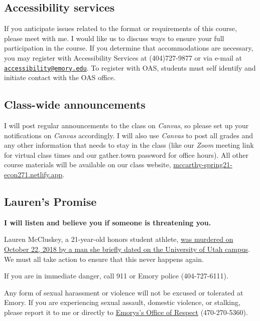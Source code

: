 \documentclass[11pt,]{article}
\begin{document}
\hypertarget{accessibility-services}{%
\subsection{Accessibility services}\label{accessibility-services}}

If you anticipate issues related to the format or requirements of this
course, please meet with me. I would like us to discuss ways to ensure
your full participation in the course. If you determine that
accommodations are necessary, you may register with Accessibility
Services at (404)727-9877 or via e-mail at
\href{mailto:accessibility@emory.edu}{\nolinkurl{accessibility@emory.edu}}.
To register with OAS, students must self identify and initiate contact
with the OAS office.

\hypertarget{class-wide-announcements}{%
\subsection{Class-wide announcements}\label{class-wide-announcements}}

I will post regular announcements to the class on \emph{Canvas}, so
please set up your notifications on \emph{Canvas} accordingly. I will
also use \emph{Canvas} to post all grades and any other information that
needs to stay in the class (like our \emph{Zoom} meeting link for
virtual class times and our gather.town password for office hours). All
other course materials will be available on our class website,
\href{https://mccarthy-spring21-econ372.netlify.app/}{mccarthy-spring21-econ271.netlify.app}.

\hypertarget{laurens-promise}{%
\subsection{Lauren's Promise}\label{laurens-promise}}

\textbf{I will listen and believe you if someone is threatening you.}

Lauren McCluskey, a 21-year-old honors student athlete,
\href{https://www.sltrib.com/opinion/commentary/2019/02/10/commentary-failing-lauren/}{was
murdered on October 22, 2018 by a man she briefly dated on the
University of Utah campus}. We must all take action to ensure that this
never happens again.

If you are in immediate danger, call 911 or Emory police (404-727-6111).

Any form of sexual harassment or violence will not be excused or
tolerated at Emory. If you are experiencing sexual assault, domestic
violence, or stalking, please report it to me or directly to
\href{http://respect.emory.edu/index.html}{Emorys's Office of Respect}
(470-270-5360).
\end{document}
